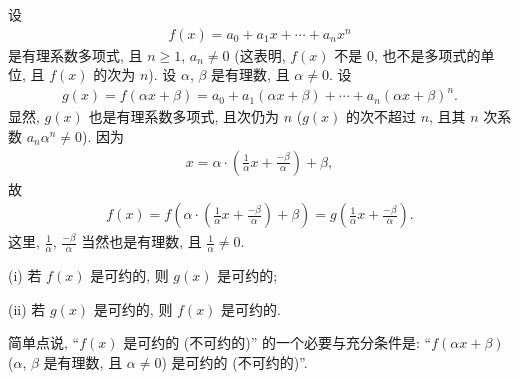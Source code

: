 \begin{proposition}
    设
    \begin{align*}
        f(x) = a_0 + a_1 x + \cdots + a_n x^n
    \end{align*}
    是有理系数多项式, 且 $n \geq 1$, $a_n \neq 0$ (这表明, $f(x)$ 不是 $0$, 也不是多项式的单位, 且 $f(x)$ 的次为 $n$). 设 $\alpha$, $\beta$ 是有理数, 且 $\alpha \neq 0$. 设
    \begin{align*}
        g(x) = f(\alpha x + \beta) = a_0 + a_1 (\alpha x + \beta) + \cdots + a_n (\alpha x + \beta)^n.
    \end{align*}
    显然, $g(x)$ 也是有理系数多项式, 且次仍为 $n$ ($g(x)$ 的次不超过 $n$, 且其 $n$ 次系数 $a_n \alpha^n \neq 0$). 因为
    \begin{align*}
        x = \alpha \cdot \left( \frac{1}{\alpha} x + \frac{-\beta}{\alpha} \right) + \beta,
    \end{align*}
    故
    \begin{align*}
        f(x) = f\left( \alpha \cdot \left( \frac{1}{\alpha} x + \frac{-\beta}{\alpha} \right) + \beta \right) = g\left( \frac{1}{\alpha} x + \frac{-\beta}{\alpha} \right).
    \end{align*}
    这里, $\frac{1}{\alpha}$, $\frac{-\beta}{\alpha}$ 当然也是有理数, 且 $\frac{1}{\alpha} \neq 0$.

    (i) 若 $f(x)$ 是可约的, 则 $g(x)$ 是可约的;

    (ii) 若 $g(x)$ 是可约的, 则 $f(x)$ 是可约的.

    简单点说, ``$f(x)$ 是可约的 (不可约的)'' 的一个必要与充分条件是: ``$f(\alpha x + \beta)$ ($\alpha$, $\beta$ 是有理数, 且 $\alpha \neq 0$) 是可约的 (不可约的)''.
\end{proposition}

